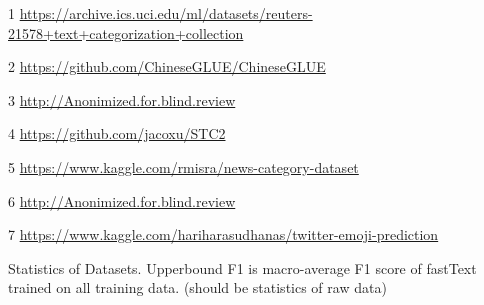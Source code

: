 \begin{table}[th]
\begin{threeparttable}
\begin{tablenotes}
	\item[1] \url{https://archive.ics.uci.edu/ml/datasets/reuters-21578+text+categorization+collection}
	\item[2] \url{https://github.com/ChineseGLUE/ChineseGLUE}
	\item[3] \url{http://Anonimized.for.blind.review}
	\item[4] \url{https://github.com/jacoxu/STC2}
	\item[5] \url{https://www.kaggle.com/rmisra/news-category-dataset}
	\item[6] \url{http://Anonimized.for.blind.review}
	\item[7] \url{https://www.kaggle.com/hariharasudhanas/twitter-emoji-prediction}
\end{tablenotes}
\end{threeparttable}
\caption{Statistics of Datasets.
	Upperbound F1 is macro-average F1 score of fastText trained on all 
	training data. (should be statistics of raw data)}
\label{table:statsOfDataset}
\end{table}
